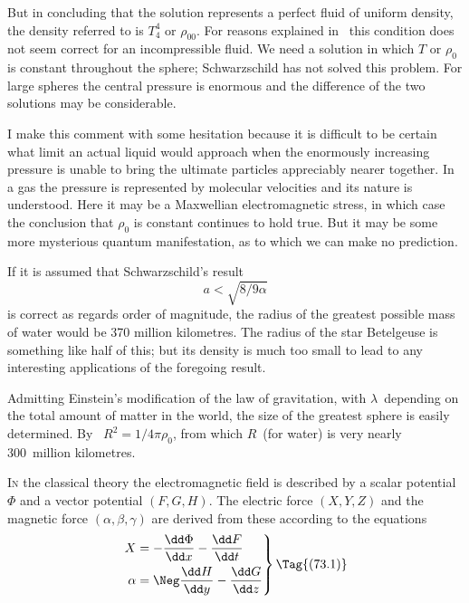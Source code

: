 \documentclass[12pt]{book}
\begin{document}
But in concluding that the solution represents a perfect fluid of uniform density, the density referred to is $T_4^4$
or $\rho_{00}$. For reasons explained in~ this condition does not seem correct for an incompressible fluid.
We need a solution in which $T$ or $\rho_0$ is constant throughout the sphere; Schwarzschild has not solved this
problem.
For large spheres the central pressure is enormous and the difference of the two solutions may be considerable.

I make this comment with some hesitation because it is difficult to be certain what limit an actual liquid would
approach when the enormously increasing pressure is unable to bring the ultimate particles appreciably nearer
together.
In a gas the pressure is represented by molecular velocities and its nature is understood.
Here it may be a Maxwellian electromagnetic stress, in which case the conclusion that $\rho_0$ is constant continues
to hold true. But it may be some more mysterious quantum manifestation, as to which we can make no prediction.

If it is assumed that Schwarzschild's result
\[
a < \sqrt{8/9\alpha}
\]
is correct as regards order of magnitude, the radius of the greatest possible
mass of water would be 370 million kilometres.
The radius of the star Betelgeuse is something like half of this; but its density is much too small to lead
to any interesting applications of the foregoing result.

Admitting Einstein's modification of the law of gravitation, with $\lambda$~depending
on the total amount of matter in the world, the size of the greatest
sphere is easily determined. By~ $R^{2} = 1/4\pi\rho_{0}$, from which $R$~(for water)
is very nearly 300~million kilometres.


%
%
%

\lettrine{\textcolor{lettrinecolour}{I}}{n} the classical theory the electromagnetic field is described by a scalar
potential~$\Phi$ and a vector potential $(F, G, H)$. The electric force $(X, Y, Z)$
%
%
and the magnetic force $(\alpha, \beta, \gamma)$ are derived from these according to the
equations
\[
\left.
\begin{aligned}
  X &= -\frac{\dd\Phi}{\dd x} - \frac{\dd F}{\dd t}\\
  \alpha &= \Neg\frac{\dd H}{\dd y} - \frac{\dd G}{\dd z}
\end{aligned}
\right\}
\Tag{(73.1)}
\]
\end{document}
